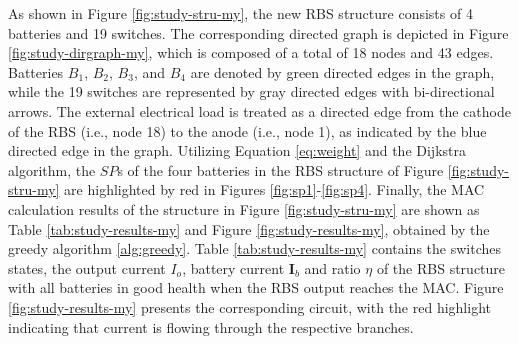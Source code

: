 \documentclass{article}
\begin{document}
As shown in Figure \ref{fig:study-stru-my}, the new RBS structure consists of 4 batteries and 19 switches. 
The corresponding directed graph is depicted in Figure \ref{fig:study-dirgraph-my}, which is composed of a total of 18 nodes and 43 edges. 
Batteries $B_1$, $B_2$, $B_3$, and $B_4$ are denoted by green directed edges in the graph, while the 19 switches are represented by gray directed edges with bi-directional arrows. 
The external electrical load is treated as a directed edge from the cathode of the RBS (i.e., node 18) to the anode (i.e., node 1), as indicated by the blue directed edge in the graph.
Utilizing Equation \ref{eq:weight} and the Dijkstra algorithm, the $SP$s of the four batteries in the RBS structure of Figure \ref{fig:study-stru-my} are highlighted by red in Figures \ref{fig:sp1}-\ref{fig:sp4}.
Finally, the MAC calculation results of the structure in Figure \ref{fig:study-stru-my} are shown as Table \ref{tab:study-results-my} and Figure \ref{fig:study-results-my}, obtained by the greedy algorithm \ref{alg:greedy}.
Table \ref{tab:study-results-my} contains the switches states, the output current $I_o$, battery current $\bm{I}_b$ and ratio $\eta$ of the RBS structure with all batteries in good health when the RBS output reaches the MAC.
Figure \ref{fig:study-results-my} presents the corresponding circuit, with the red highlight indicating that current is flowing through the respective branches.
\end{document}
